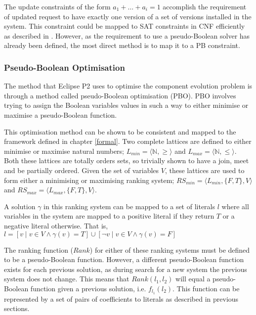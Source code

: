 The update constraints of the form $a_1 + \ldots + a_i = 1$ accomplish the requirement of updated request to have exactly one version of a set of versions installed in the system.
This constraint could be mapped to SAT constraints in CNF efficiently as described in \citep{silva2007}.
However, as the requirement to use a pseudo-Boolean solver has already been defined, the most direct method is to map it to a PB constraint.

\subsubsection{Pseudo-Boolean Optimisation}
The method that Eclipse P2 uses to optimise the component evolution problem is through a method called pseudo-Boolean optimisation (PBO).
PBO involves trying to assign the Boolean variables values in such a way to either minimise or maximise a pseudo-Boolean function.

This optimisation method can be shown to be consistent and mapped to the framework defined in chapter \ref{formal}.
Two complete lattices are defined to either minimise or maximise natural numbers; $L_{min} = \langle \mathbb{N}, \geq \rangle$ and $L_{max} = \langle \mathbb{N}, \leq \rangle$.
Both these lattices are totally orders sets, so trivially shown to have a join, meet and be partially ordered.
Given the set of variables $V$, these lattices are used to form either a minimising or maximising  ranking system;
$RS_{min} = \langle L_{min}, \{F,T\}, V \rangle$ and $RS_{max} = \langle L_{max}, \{F,T\}, V \rangle$. 

A solution $\gamma$ in this ranking system can be mapped to a set of literals $l$
where all variables in the system are mapped to a positive literal if they return $T$ or a negative literal otherwise.
That is, $l = [v \mid v \in V \wedge \gamma(v) = T] \cup [\neg v \mid v \in V \wedge \gamma(v) = F]$

The ranking function ($Rank$) for either of these ranking systems must be defined to be a pseudo-Boolean function.
However, a different pseudo-Boolean function exists for each previous solution, as during search for a new system the previous system does not change.
This means that $Rank(l_1,l_2)$ will equal a pseudo-Boolean function given a previous solution, i.e. $f_{l_1}(l_2)$.
This function can be represented by a set of pairs of coefficients to literals as described in previous sections.

